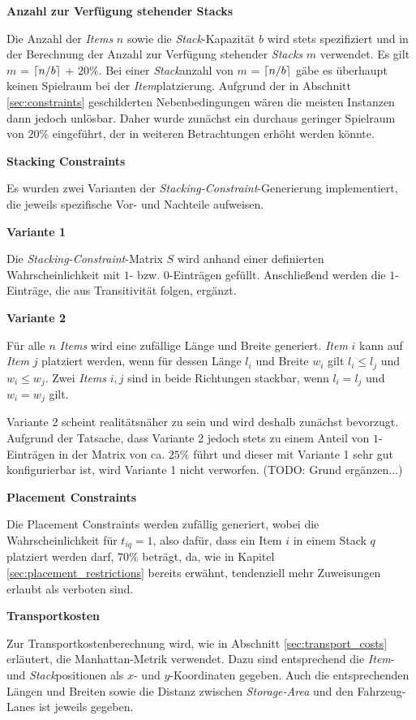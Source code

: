 \textbf{Anzahl zur Verfügung stehender Stacks}

Die Anzahl der \textit{Items} $n$ sowie die \textit{Stack}-Kapazität $b$ wird stets spezifiziert und in der Berechnung der Anzahl
zur Verfügung stehender \textit{Stacks} $m$ verwendet. Es gilt $m$ = $\lceil n / b\rceil$ + $20 \%$.
Bei einer \textit{Stack}anzahl von $m$ = $\lceil n / b\rceil$ gäbe es überhaupt keinen Spielraum bei der \textit{Item}platzierung. Aufgrund der in Abschnitt \ref{sec:constraints} geschilderten Nebenbedingungen wären die meisten Instanzen dann jedoch unlösbar.
Daher wurde zunächst ein durchaus geringer Spielraum von $20 \%$ eingeführt, der in weiteren Betrachtungen erhöht werden könnte.

\textbf{Stacking Constraints}

Es wurden zwei Varianten der \textit{Stacking-Constraint}-Generierung implementiert, die jeweils spezifische Vor- und Nachteile aufweisen.

\textbf{Variante 1}

Die \textit{Stacking-Constraint}-Matrix $S$ wird anhand einer definierten Wahrscheinlichkeit mit $1$- bzw. $0$-Einträgen gefüllt.
Anschließend werden die $1$-Einträge, die aus Transitivität folgen, ergänzt.

\textbf{Variante 2}

Für alle $n$ \textit{Items} wird eine zufällige Länge und Breite generiert. \textit{Item} $i$ kann auf \textit{Item} $j$ platziert werden,
wenn für dessen Länge $l_i$ und Breite $w_i$ gilt $l_i \leq l_j$ und $w_i \leq w_j$.
Zwei \textit{Items} $i, j$ sind in beide Richtungen stackbar, wenn $l_i = l_j$ und $w_i = w_j$ gilt.

Variante 2 scheint realitätsnäher zu sein und wird deshalb zunächst bevorzugt. Aufgrund der Tatsache, dass Variante 2 jedoch stets
zu einem Anteil von $1$-Einträgen in der Matrix von ca. $25\%$ führt und dieser mit Variante 1 sehr gut konfigurierbar ist, wird Variante 1 nicht verworfen. (TODO: Grund ergänzen...)

\textbf{Placement Constraints}

Die Placement Constraints werden zufällig generiert, wobei die Wahrscheinlichkeit für $t_{iq} = 1$, also dafür,
dass ein Item $i$ in einem Stack $q$ platziert werden darf, $70 \%$ beträgt, da, wie in Kapitel \ref{sec:placement_restrictions} bereits erwähnt, tendenziell mehr Zuweisungen erlaubt als verboten sind.

\textbf{Transportkosten}

Zur Transportkostenberechnung wird, wie in Abschnitt \ref{sec:transport_costs} erläutert, die Manhattan-Metrik verwendet. Dazu sind
entsprechend die \textit{Item}- und \textit{Stack}positionen als $x$- und $y$-Koordinaten gegeben. Auch die entsprechenden Längen und Breiten sowie die Distanz zwischen \textit{Storage-Area} und den Fahrzeug-Lanes ist jeweils gegeben.

